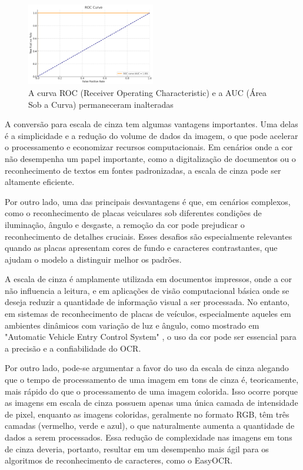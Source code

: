 \documentclass[conference]{IEEEtran}
\begin{document}
\begin{figure}[htbp]
	\centerline{\includegraphics[width=0.5\textwidth]{img7.png}}
	\caption{A curva ROC (Receiver Operating Characteristic) e a AUC (Área Sob a Curva) permaneceram inalteradas }
	\label{img7}
\end{figure}

A conversão para escala de cinza tem algumas vantagens importantes. Uma delas é a simplicidade e a redução do volume de dados da imagem, o que pode acelerar o processamento e economizar recursos computacionais. Em cenários onde a cor não desempenha um papel importante, como a digitalização de documentos ou o reconhecimento de textos em fontes padronizadas, a escala de cinza pode ser altamente eficiente.

Por outro lado, uma das principais desvantagens é que, em cenários complexos, como o reconhecimento de placas veiculares sob diferentes condições de iluminação, ângulo e desgaste, a remoção da cor pode prejudicar o reconhecimento de detalhes cruciais. Esses desafios são especialmente relevantes quando as placas apresentam cores de fundo e caracteres contrastantes, que ajudam o modelo a distinguir melhor os padrões.

A escala de cinza é amplamente utilizada em documentos impressos, onde a cor não influencia a leitura, e em aplicações de visão computacional básica onde se deseja reduzir a quantidade de informação visual a ser processada. No entanto, em sistemas de reconhecimento de placas de veículos, especialmente aqueles em ambientes dinâmicos com variação de luz e ângulo, como mostrado em "Automatic Vehicle Entry Control System" \cite{b9}, o uso da cor pode ser essencial para a precisão e a confiabilidade do OCR.

Por outro lado, pode-se argumentar a favor do uso da escala de cinza alegando que o tempo de processamento de uma imagem em tons de cinza é, teoricamente, mais rápido do que o processamento de uma imagem colorida. Isso ocorre porque as imagens em escala de cinza possuem apenas uma única camada de intensidade de pixel, enquanto as imagens coloridas, geralmente no formato RGB, têm três camadas (vermelho, verde e azul), o que naturalmente aumenta a quantidade de dados a serem processados. Essa redução de complexidade nas imagens em tons de cinza deveria, portanto, resultar em um desempenho mais ágil para os algoritmos de reconhecimento de caracteres, como o EasyOCR.
\end{document}
